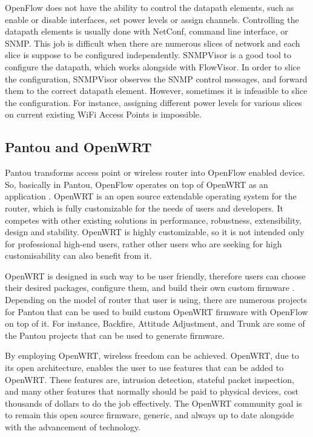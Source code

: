 OpenFlow does not have the ability to control the datapath elements, such as enable or disable interfaces, set power levels or assign channels. Controlling the datapath elements is usually done with NetConf, command line interface, or SNMP. This job is difficult when there are numerous slices of network and each slice is suppose to be configured independently. SNMPVisor is a good tool to configure the datapath, which works alongside with FlowVisor. In order to slice the configuration, SNMPVisor observes the SNMP control messages, and forward them to the correct datapath element. However, sometimes it is infeasible to slice the configuration. For instance, assigning different power levels for various slices on current existing WiFi Access Points is impossible. 

\subsection{Pantou and OpenWRT}

Pantou transforms access point or wireless router into OpenFlow enabled device. So, basically in Pantou, OpenFlow operates on top of OpenWRT as an application \cite{Yia04}. OpenWRT is an open source extendable operating system for the router, which is fully customizable for the needs of users and developers. It competes with other existing solutions in performance, robustness, extensibility, design and stability. OpenWRT is highly customizable, so it is not intended only for professional high-end users, rather other users who are seeking for high customisability can also benefit from it.  \cite{Lor14}

OpenWRT is designed in such way to be user friendly, therefore users can choose their desired packages, configure them, and build their own custom firmware \cite{Lor14}. Depending on the model of router that user is using, there are numerous projects for Pantou that can be used to build custom OpenWRT firmware with OpenFlow on top of it. For instance, Backfire, Attitude Adjustment, and Trunk are some of the Pantou projects that can be used to generate firmware. \cite{Sve14}

By employing OpenWRT, wireless freedom can be achieved. OpenWRT, due to its open architecture, enables the user to use features that can be added to OpenWRT. These features are, intrusion detection, stateful packet inspection, and many other features that normally should be paid to physical devices, cost thousands of dollars to do the job effectively. The OpenWRT community goal is to remain this open source firmware, generic, and always up to date alongside with the advancement of technology. 


